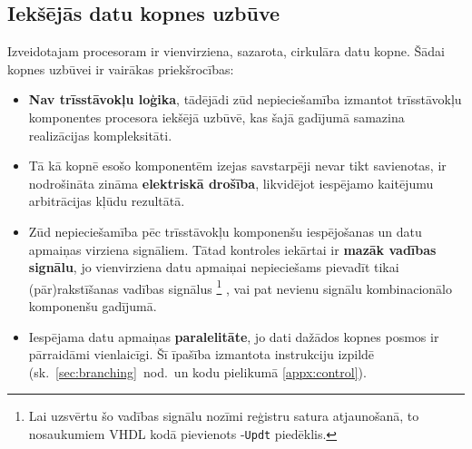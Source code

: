 \subsection{Iekšējās datu kopnes uzbūve} \label{sec:databus}
Izveidotajam procesoram ir vienvirziena, sazarota, 
cirkulāra datu kopne.
Šādai kopnes uzbūvei ir vairākas priekšrocības:
\begin{itemize}
	\item \textbf{Nav trīsstāvokļu loģika}, tādējādi zūd nepieciešamība
		izmantot trīsstāvokļu komponentes procesora iekšējā uzbūvē,
		kas šajā gadījumā samazina realizācijas kompleksitāti.
	\item Tā kā kopnē esošo komponentēm izejas savstarpēji nevar tikt
		savienotas, ir nodrošināta zināma \textbf{elektriskā drošība},
		likvidējot iespējamo kaitējumu arbitrācijas kļūdu rezultātā.
	\item Zūd nepieciešamība pēc trīsstāvokļu komponenšu iespējošanas un
		datu apmaiņas virziena signāliem. Tātad kontroles iekārtai ir
		\textbf{mazāk vadības signālu}, jo vienvirziena datu
		apmaiņai nepieciešams pievadīt tikai (pār)rakstīšanas vadības signālus%
		\footnote{Lai uzsvērtu šo vadības signālu nozīmi reģistru satura
			atjaunošanā, to nosaukumiem VHDL kodā pievienots -\texttt{Updt} piedēklis.}%
		, vai pat nevienu signālu kombinacionālo komponenšu gadījumā.
	\item Iespējama datu apmaiņas \textbf{paralelitāte}, jo dati dažādos
		kopnes posmos ir pārraidāmi vienlaicīgi. Šī īpašība izmantota
		 instrukciju izpildē 
		(sk.~\ref{sec:branching}~nod.~un kodu
		pielikumā \ref{appx:control}).
\end{itemize}


